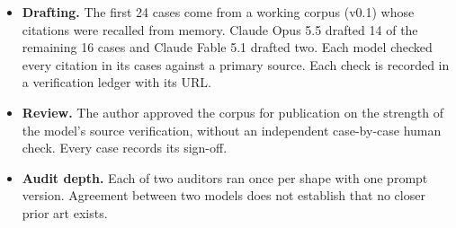 \documentclass[10pt,twocolumn]{article}
\begin{document}
\begin{itemize}
\item \textbf{Drafting.} The first 24 cases come from a working corpus
  (v0.1) whose citations were recalled from memory. Claude Opus 5.5 drafted
  14 of the remaining 16 cases and Claude Fable 5.1 drafted two. Each model
  checked every citation in its cases against a primary source.
  Each check is recorded in a verification ledger with its URL.
\item \textbf{Review.} The author approved the corpus for publication on the
  strength of the model's source verification, without an independent
  case-by-case human check. Every case records its sign-off.
\item \textbf{Audit depth.} Each of two auditors ran once per shape with
  one prompt version. Agreement between two models does not establish that
  no closer prior art exists.
\end{itemize}



\end{document}
